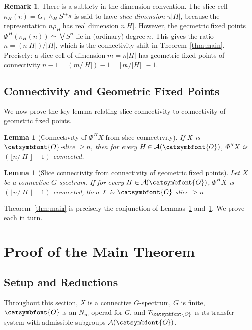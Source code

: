 \documentclass[12pt]{article}
\newcommand{\aO}{{\catsymbfont{O}}}
\newcommand{\aT}{{\mathcal{T}}}
\newtheorem{lemma}[theorem]{Lemma}
\theoremstyle{definition}
\newtheorem{remark}[theorem]{Remark}
\begin{document}
\begin{remark}\label{rem:dimension-convention}
There is a subtlety in the dimension convention.  The slice cell $\kappa_H(n) = G_+\wedge_H S^{n\rho_H}$ is said to have \emph{slice dimension} $n|H|$, because the representation $n\rho_H$ has real dimension $n|H|$.  However, the geometric fixed points $\Phi^H(\kappa_H(n)) \simeq \bigvee S^n$ lie in (ordinary) degree $n$.  This gives the ratio $n = (n|H|)/|H|$, which is the connectivity shift in Theorem~\ref{thm:main}.  Precisely: a slice cell of dimension $m = n|H|$ has geometric fixed points of connectivity $n-1 = (m/|H|)-1 = \lfloor m/|H|\rfloor - 1$.
\end{remark}

\subsection{Connectivity and Geometric Fixed Points}

We now prove the key lemma relating slice connectivity to connectivity of geometric fixed points.

\begin{lemma}[Connectivity of $\Phi^H X$ from slice connectivity]\label{lem:forward}
If $X$ is $\aO$-slice $\geq n$, then for every $H\in\mathcal{A}(\aO)$, $\Phi^H X$ is $(\lfloor n/|H|\rfloor - 1)$-connected.
\end{lemma}

\begin{lemma}[Slice connectivity from connectivity of geometric fixed points]\label{lem:backward}
Let $X$ be a connective $G$-spectrum.  If for every $H\in\mathcal{A}(\aO)$, $\Phi^H X$ is $(\lfloor n/|H|\rfloor - 1)$-connected, then $X$ is $\aO$-slice $\geq n$.
\end{lemma}

Theorem~\ref{thm:main} is precisely the conjunction of Lemmas~\ref{lem:forward} and~\ref{lem:backward}.  We prove each in turn.

\section{Proof of the Main Theorem}

\subsection{Setup and Reductions}

Throughout this section, $X$ is a connective $G$-spectrum, $G$ is finite, $\aO$ is an $N_\infty$ operad for $G$, and $\aT_\aO$ is its transfer system with admissible subgroups $\mathcal{A}(\aO)$.
\end{document}
